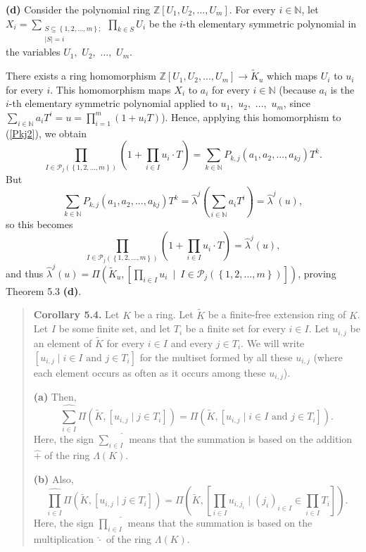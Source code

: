 \documentclass[12pt,final,notitlepage,onecolumn,german]{article}%
\begin{document}
\textbf{(d)} Consider the polynomial ring $\mathbb{Z}\left[  U_{1}%
,U_{2},...,U_{m}\right]  $. For every $i\in\mathbb{N}$, let $X_{i}%
=\sum\limits_{\substack{S\subseteq\left\{  1,2,...,m\right\}  ;\\\left\vert
S\right\vert =i}}\prod\limits_{k\in S}U_{i}$ be the $i$-th elementary
symmetric polynomial in the variables $U_{1},$ $U_{2},$ $...,$ $U_{m}$.

There exists a ring homomorphism $\mathbb{Z}\left[  U_{1},U_{2},...,U_{m}%
\right]  \rightarrow\widetilde{K}_{u}$ which maps $U_{i}$ to $u_{i}$ for every
$i$. This homomorphism maps $X_{i}$ to $a_{i}$ for every $i\in\mathbb{N}$
(because $a_{i}$ is the $i$-th elementary symmetric polynomial applied to
$u_{1},$ $u_{2},$ $...,$ $u_{m}$, since $\sum\limits_{i\in\mathbb{N}}%
a_{i}T^{i}=u=\prod\limits_{i=1}^{m}\left(  1+u_{i}T\right)  $). Hence,
applying this homomorphism to (\ref{Pkj2}), we obtain%
\[
\prod_{I\in\mathcal{P}_{j}\left(  \left\{  1,2,...,m\right\}  \right)
}\left(  1+\prod_{i\in I}u_{i}\cdot T\right)  =\sum_{k\in\mathbb{N}}%
P_{k,j}\left(  a_{1},a_{2},...,a_{kj}\right)  T^{k}.
\]
But%
\[
\sum_{k\in\mathbb{N}}P_{k,j}\left(  a_{1},a_{2},...,a_{kj}\right)
T^{k}=\widehat{\lambda}^{j}\left(  \sum_{i\in\mathbb{N}}a_{i}T^{i}\right)
=\widehat{\lambda}^{j}\left(  u\right)  ,
\]
so this becomes%
\[
\prod_{I\in\mathcal{P}_{j}\left(  \left\{  1,2,...,m\right\}  \right)
}\left(  1+\prod_{i\in I}u_{i}\cdot T\right)  =\widehat{\lambda}^{j}\left(
u\right)  ,
\]
and thus $\widehat{\lambda}^{j}\left(  u\right)  =\Pi\left(  \widetilde{K}%
_{u},\left[  \prod\limits_{i\in I}u_{i}\ \mid\ I\in\mathcal{P}_{j}\left(
\left\{  1,2,...,m\right\}  \right)  \right]  \right)  $, proving Theorem 5.3
\textbf{(d)}.

\begin{quote}
\textbf{Corollary 5.4.} Let $K$ be a ring. Let $\widetilde{K}$ be a
finite-free extension ring of $K$. Let $I$ be some finite set, and let $T_{i}$
be a finite set for every $i\in I$. Let $u_{i,j}$ be an element of
$\widetilde{K}$ for every $i\in I$ and every $j\in T_{i}$. We will write
$\left[  u_{i,j}\mid i\in I\text{ and }j\in T_{i}\right]  $ for the multiset
formed by all these $u_{i,j}$ (where each element occurs as often as it occurs
among these $u_{i,j}$).

\textbf{(a)} Then,%
\[
\widehat{\sum_{i\in I}}\Pi\left(  \widetilde{K},\left[  u_{i,j}\mid j\in
T_{i}\right]  \right)  =\Pi\left(  \widetilde{K},\left[  u_{i,j}\mid i\in
I\text{ and }j\in T_{i}\right]  \right)  .
\]
Here, the sign $\widehat{\sum\limits_{i\in I}}$ means that the summation is
based on the addition $\widehat{+}$ of the ring $\Lambda\left(  K\right)  $.

\textbf{(b)} Also,%
\[
\widehat{\prod_{i\in I}}\Pi\left(  \widetilde{K},\left[  u_{i,j}\mid j\in
T_{i}\right]  \right)  =\Pi\left(  \widetilde{K},\left[  \prod_{i\in
I}u_{i,j_{i}}\mid\left(  j_{i}\right)  _{i\in I}\in\prod_{i\in I}T_{i}\right]
\right)  .
\]
Here, the sign $\widehat{\prod\limits_{i\in I}}$ means that the summation is
based on the multiplication $\widehat{\cdot}$ of the ring $\Lambda\left(
K\right)  $.
\end{quote}
\end{document}
